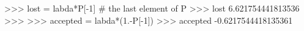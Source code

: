 
>>> lost = labda*P[-1] # the last element of P
>>> lost
6.621754441813536
>>>
>>> accepted = labda*(1.-P[-1])
>>> accepted
-0.6217544418135361

